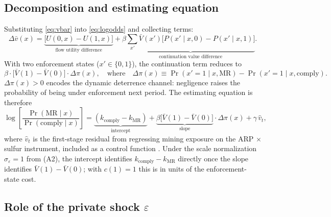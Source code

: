 \subsection{Decomposition and estimating equation}

Substituting \eqref{eq:vbar} into \eqref{eq:logodds} and collecting terms:
\begin{equation}
\Delta \bar v(x) = \underbrace{\big[ U(0, x) - U(1, x) \big]}_{\text{flow utility difference}}
+ \beta \underbrace{\sum_{x'} \bar V(x')
\big[ P(x' \mid x, 0) - P(x' \mid x, 1) \big]}_{\text{continuation value difference}}.
\label{eq:decomp}
\end{equation}
With two enforcement states ($x' \in \{0, 1\}$), the continuation term reduces
to
\begin{equation*}
\beta \cdot \big[\bar V(1) - \bar V(0)\big] \cdot \Delta \pi(x),
\quad \text{where} \quad
\Delta \pi(x) \equiv \Pr(x' = 1 \mid x, \text{MR}) - \Pr(x' = 1 \mid x, \text{comply}).
\end{equation*}
$\Delta \pi(x) > 0$ encodes the dynamic deterrence channel: negligence raises
the probability of being under enforcement next period. The estimating
equation is therefore
\begin{equation}
\log \!\left[ \frac{\Pr(\text{MR} \mid x)}{\Pr(\text{comply} \mid x)} \right]
= \underbrace{(k_{\text{comply}} - k_{\text{MR}})}_{\text{intercept}}
+ \underbrace{\beta \big[\bar V(1) - \bar V(0)\big]}_{\text{slope}}
\cdot \Delta \pi(x) + \gamma \, \hat{v}_t,
\label{eq:estimating}
\end{equation}
where $\hat{v}_t$ is the first-stage residual from regressing mining exposure on
the ARP $\times$ sulfur instrument, included as a control function
\citep{petrintrain2010, wooldridge2015control}. Under the scale normalization
$\sigma_\varepsilon = 1$ from (A2), the intercept identifies
$k_{\text{comply}} - k_{\text{MR}}$ directly once the slope identifies
$\bar V(1) - \bar V(0)$; with $c(1) = 1$ this is in units of the
enforcement-state cost.

\subsection{Role of the private shock $\varepsilon$}


